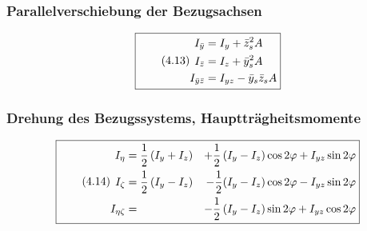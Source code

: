\documentclass[11pt]{article}
\newcommand{\1}{ {\mathds{1}} }
\begin{document}
\begin{multicols}{2}
%
%
%
%

		\subsubsection{Parallelverschiebung der Bezugsachsen}

		\begin{equation}
			\boxed{
				\tag{4.13}
				\begin{split}
					I_{\bar{y}} &= I_y + \bar{z}^2_s A\\
					I_{\bar{z}} &= I_z + \bar{y}^2_s A\\
					I_{\bar{y} \bar{z}} &= I_{yz} - \bar{y}_{s} \bar{z}_{s} A
				\end{split}
			}
		\end{equation}

		\subsubsection{Drehung des Bezugssystems, Hauptträgheitsmomente}

		\begin{equation}
			\boxed{
				\tag{4.14}
				\begin{split}
					I_{\eta} &= \frac{1}{2}\left( I_y + I_z \right) &+ \frac{1}{2}\left( I_y - I_z \right)\cos{2\varphi} + I_{yz} \sin{2\varphi}\\
					I_{\zeta} &= \frac{1}{2}\left( I_y - I_z \right)&-\frac{1}{2}(I_y-I_z)\cos{2\varphi} -I_{yz}\sin{2\varphi}\\
					I_{\eta \zeta} &=  &-\frac{1}{2}\left( I_y - I_z \right)\sin{2\varphi} + I_{yz}\cos{2\varphi}
				\end{split}
			}
		\end{equation}


\end{multicols}
\end{document}
